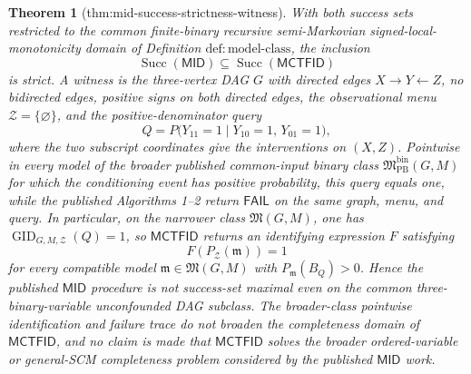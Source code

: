 \documentclass{article}
\newtheorem{theorem}{Theorem}
\begin{document}
\begin{theorem}[thm:mid-success-strictness-witness]\label{thm:mid-success-strictness-witness}
With both success sets restricted to the common finite-binary recursive semi-Markovian signed-local-monotonicity domain of Definition \(\mathrm{def:model\text{-}class}\), the inclusion
\[
 \operatorname{Succ}(\mathsf{MID})
 \subseteq
 \operatorname{Succ}(\mathsf{MCTFID})
\]
is strict.  A witness is the three-vertex DAG \(G\) with directed edges \(X\to Y\leftarrow Z\), no bidirected edges, positive signs on both directed edges, the observational menu \(\mathcal Z=\{\varnothing\}\), and the positive-denominator query
\[
 Q=P\bigl(Y_{11}=1\mid Y_{10}=1,\,Y_{01}=1\bigr),
\]
where the two subscript coordinates give the interventions on \((X,Z)\).  Pointwise in every model of the broader published common-input binary class \(\mathfrak M_{\mathrm{PB}}^{\mathrm{bin}}(G,M)\) for which the conditioning event has positive probability, this query equals one, while the published Algorithms 1--2 return \(\mathsf{FAIL}\) on the same graph, menu, and query.  In particular, on the narrower class \(\mathfrak M(G,M)\), one has \(\operatorname{GID}_{G,M,\mathcal Z}(Q)=1\), so \(\mathsf{MCTFID}\) returns an identifying expression \(F\) satisfying
\[
 F(P_{\mathcal Z}(\mathfrak m))=1
\]
for every compatible model \(\mathfrak m\in\mathfrak M(G,M)\) with \(P_{\mathfrak m}(B_Q)>0\).  Hence the published \(\mathsf{MID}\) procedure is not success-set maximal even on the common three-binary-variable unconfounded DAG subclass.  The broader-class pointwise identification and failure trace do not broaden the completeness domain of \(\mathsf{MCTFID}\), and no claim is made that \(\mathsf{MCTFID}\) solves the broader ordered-variable or general-SCM completeness problem considered by the published \(\mathsf{MID}\) work.
\end{theorem}
\end{document}
